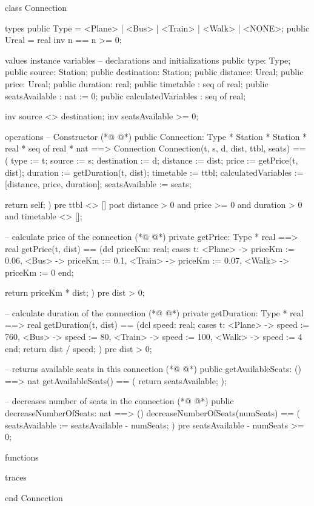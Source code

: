 \begin{vdmpp}[breaklines=true]
class Connection

types
 public Type = <Plane> | <Bus> | <Train> | <Walk> | <NONE>;
 public Ureal = real
        inv n == n >= 0;

values
instance variables
 -- declarations and initializations
 public type: Type;
 public source: Station;
 public destination: Station;
 public distance: Ureal;
 public price: Ureal;
 public duration: real;
 public timetable : seq of real;
 public seatsAvailable : nat := 0;
 public calculatedVariables : seq of real;
 
 inv source <> destination;
 inv seatsAvailable >= 0;
 
operations
 -- Constructor
(*@
\label{Connection:26}
@*)
 public Connection: Type * Station * Station * real * seq of real * nat ==> Connection
 Connection(t, s, d, dist, ttbl, seats) ==
 (
  type := t;
  source := s;
  destination := d;
  distance := dist;
  price := getPrice(t, dist);
  duration := getDuration(t, dist);
  timetable := ttbl;
  calculatedVariables := [distance, price, duration];
  seatsAvailable := seats;
  
  return self;
 )
 pre ttbl <> []
 post distance > 0 and price >= 0 and duration > 0 and timetable <> [];
 
 -- calculate price of the connection
(*@
\label{getPrice:45}
@*)
 private getPrice: Type * real ==> real
 getPrice(t, dist) ==
 (dcl priceKm: real;
   cases t:
    <Plane> -> priceKm := 0.06,
    <Bus> -> priceKm := 0.1,
    <Train> -> priceKm := 0.07,
    <Walk> -> priceKm := 0
   end;
   
   return priceKm * dist;
 )
 pre dist > 0;
 
 -- calculate duration of the connection
(*@
\label{getDuration:60}
@*)
 private getDuration: Type * real ==> real
 getDuration(t, dist) ==
 (dcl speed: real;
  cases t:
    <Plane> -> speed := 760,
    <Bus> -> speed := 80, 
    <Train> -> speed := 100,
    <Walk> -> speed := 4
   end;
   return dist / speed;
 )
 pre dist > 0;
 
 -- returns available seats in this connection
(*@
\label{getAvailableSeats:74}
@*)
 public getAvailableSeats: () ==> nat
 getAvailableSeats() ==
 (
  return seatsAvailable;
 );
 
 -- decreases number of seats in the connection
(*@
\label{decreaseNumberOfSeats:81}
@*)
 public decreaseNumberOfSeats: nat ==> ()
 decreaseNumberOfSeats(numSeats) ==
 (
  seatsAvailable := seatsAvailable - numSeats;
 )
 pre seatsAvailable - numSeats >= 0;
 
  
functions

traces

end Connection
\end{vdmpp}
